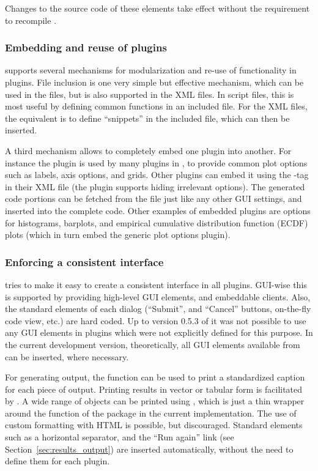 Changes to the source code of these elements take effect without the requirement to recompile .

\subsubsection{Embedding and reuse of plugins}
\label{sec:technical_plugins_embedding}
 supports several mechanisms for modularization and re-use of
functionality in plugins. File inclusion is one very simple but effective
mechanism, which can be used in the  files, but is also supported in
the XML files. In script files, this is most useful by defining common functions
in an included file. For the XML files, the equivalent is to define ``snippets''
in the included file, which can then be inserted.

A third mechanism allows to completely embed one plugin into another. For
instance the  plugin is used by many plugins in , to provide
common plot options such as labels, axis options, and grids. Other plugins
can embed it using the -tag in their XML file (the plugin supports
hiding irrelevant options). The generated code portions can be fetched from the
 file just like any other GUI settings, and inserted into the complete
code. Other examples of embedded plugins are options for histograms, barplots,
and empirical cumulative distribution function (ECDF) plots (which in turn embed the generic plot options plugin).

\subsubsection{Enforcing a consistent interface}
\label{sec:technical_plugins_consistency}
 tries to make it easy to create a consistent interface in all plugins.
GUI-wise this is supported by providing high-level GUI elements, and embeddable
clients. Also, the standard elements of each dialog (``Submit'', and
``Cancel'' buttons, on-the-fly code view, etc.) are hard coded. Up to version
0.5.3 of  it was not possible to use any GUI elements in plugins which
were not explicitly defined for this purpose. In the current development
version, theoretically, all GUI elements available from  can be inserted,
where necessary.

For generating output, the function  can be used to print a
standardized caption for each piece of output. Printing results in vector or
tabular form is facilitated by . A wide range of objects can be
printed using , which is just a thin wrapper around the
 function of the  package \citep{Lecoutre2003} in the current
implementation. The use of custom formatting with HTML is possible, but
discouraged. Standard elements such as a horizontal separator, and the ``Run again''
link (see Section~\ref{sec:results_output}) are inserted automatically, without the need to define
them for each plugin.

